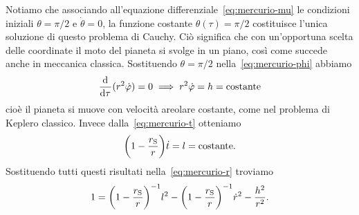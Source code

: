 Notiamo che associando all'equazione differenziale~\eqref{eq:mercurio-mu} le
condizioni iniziali $\theta = \pi/2$ e $\dot{\theta} = 0$, la funzione costante
$\theta(\tau) = \pi/2$ costituisce l'unica soluzione di questo problema di
Cauchy.  Ciò significa che con un'opportuna scelta delle coordinate il moto del
pianeta si svolge in un piano, così come succede anche in meccanica classica.
Sostituendo $\theta = \pi/2$ nella~\eqref{eq:mercurio-phi} abbiamo
\begin{equation}
  \label{eq:mercurio-phi2}
  \frac{{\mathop{}\!\mathrm{d}^{}}}{\mathop{}\!\mathrm{d} {\tau}^{}}(r^{2}\dot{\varphi}) = 0 \implies r^{2}\dot{\varphi} = h =
  \text{costante}
\end{equation}
cioè il pianeta si muove con velocità areolare costante, come nel problema di
Keplero classico.  Invece dalla~\eqref{eq:mercurio-t} otteniamo
\begin{equation}
  \label{eq:mercurio-t2}
  \bigg(1 - \frac{r_{\textup{S}}}{r}\bigg)\dot{t} = l = \text{costante}.
\end{equation}
Sostituendo tutti questi risultati nella~\eqref{eq:mercurio-r} troviamo
\begin{equation}
  \label{eq:mercurio-r2}
  1 = \bigg(1 - \frac{r_{\textup{S}}}{r}\bigg)^{-1}l^{2} - \bigg(1 -
  \frac{r_{\textup{S}}}{r}\bigg)^{-1}\dot{r}^{2} - \frac{h^{2}}{r^{2}}.
\end{equation}

